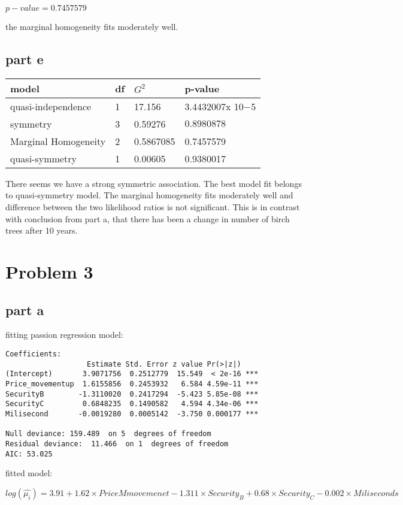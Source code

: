 \documentclass[]{article}
\begin{document}
\(p-value = 0.7457579\)

the marginal homogeneity fits moderately well.

\subsection{part e}\label{part-e}

\begin{longtable}[c]{@{}llll@{}}
\toprule
model & df & \(G^2\) & p-value\tabularnewline
\midrule
\endhead
quasi-independence & 1 & 17.156 & 3.4432007x 10−5\tabularnewline
symmetry & 3 & 0.59276 & \(0.8980878\)\tabularnewline
Marginal Homogeneity & 2 & 0.5867085 & 0.7457579\tabularnewline
quasi-symmetry & 1 & 0.00605 & 0.9380017\tabularnewline
\bottomrule
\end{longtable}

There seems we have a strong symmetric association. The best model fit
belongs to quasi-symmetry model. The marginal homogeneity fits
moderately well and difference between the two likelihood ratios is not
significant. This is in contrast with conclusion from part a, that there
has been a change in number of birch trees after 10 years.

\section{Problem 3}\label{problem-3}

\subsection{part a}\label{part-a-1}

fitting passion regression model:

\begin{verbatim}
Coefficients:
                   Estimate Std. Error z value Pr(>|z|)    
(Intercept)       3.9071756  0.2512779  15.549  < 2e-16 ***
Price_movementup  1.6155856  0.2453932   6.584 4.59e-11 ***
SecurityB        -1.3110020  0.2417294  -5.423 5.85e-08 ***
SecurityC         0.6848235  0.1490582   4.594 4.34e-06 ***
Milisecond       -0.0019280  0.0005142  -3.750 0.000177 ***

Null deviance: 159.489  on 5  degrees of freedom
Residual deviance:  11.466  on 1  degrees of freedom
AIC: 53.025
\end{verbatim}

fitted model:

\(log(\hat{\mu_i}) = 3.91 + 1.62 \times PriceMmovemenet - 1.311 \times Security_B + 0.68 \times Security_C - 0.002 \times Miliseconds\)
\end{document}
